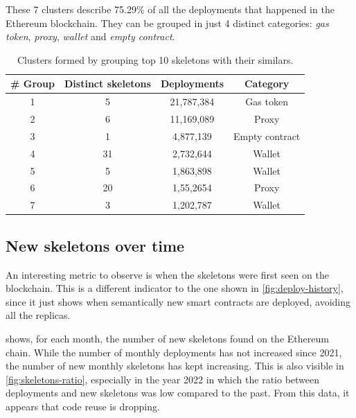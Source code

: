 These 7 clusters describe 75.29\% of all the deployments that happened in the Ethereum blockchain. They can be grouped in just 4 distinct categories: \textit{gas token}, \textit{proxy}, \textit{wallet} and \textit{empty contract}.

\begin{table}[H]
\centering
    \begin{threeparttable}
    \begin{tabular}{ c c c c } 
    \toprule
    \textbf{\# Group} & \textbf{Distinct skeletons} & \textbf{Deployments} & \textbf{Category} \\
    \midrule  
    1 & 5 & 21,787,384 & Gas token \\ [1.2ex]
    2 & 6 & 11,169,089 & Proxy \\ [1.2ex]
    3 & 1 & 4,877,139 & Empty contract \\ [1.2ex]
    4 & 31 & 2,732,644 & Wallet \\ [1.2ex]
    5 & 5 & 1,863,898 & Wallet \\ [1.2ex]
    6 & 20 & 1,55,2654 & Proxy \\ [1.2ex]
    7 & 3 & 1,202,787 & Wallet \\ [1.2ex]
    \bottomrule
    \end{tabular}
    \end{threeparttable}
    \caption{Clusters formed by grouping top 10 skeletons with their similars.}
    \label{table:top-skeletons-clusters}
\end{table}

\subsection{New skeletons over time}

An interesting metric to observe is when the skeletons were first seen on the blockchain. This is a different indicator to the one shown in \cref{fig:deploy-history}, since it just shows when semantically new smart contracts are deployed, avoiding all the replicas.

 shows, for each month, the number of new skeletons found on the Ethereum chain. While the number of monthly deployments has not increased since 2021, the number of new monthly skeletons has kept increasing. This is also visible in \cref{fig:skeletons-ratio}, especially in the year 2022 in which the ratio between deployments and new skeletons was low compared to the past. From this data, it appears that code reuse is dropping. 

